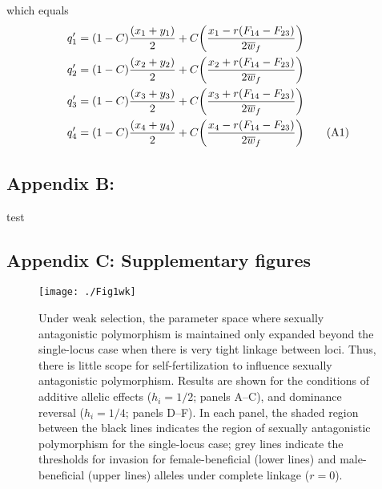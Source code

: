 \documentclass{article}
\newcommand\numberthis{\addtocounter{equation}{1}\tag{\theequation}}
\begin{document}
which equals 
\begin{align*}
	q'_1 &= (1 - C) \frac{(x_1 + y_1)}{2} + C \bigg( \frac{x_1 - r(F_{14} - F_{23})}{2 \overline{w}_f} \bigg) \\
	q'_2 &= (1 - C) \frac{(x_2 + y_2)}{2} + C \bigg( \frac{x_2 + r(F_{14} - F_{23})}{2 \overline{w}_f} \bigg) \\
	q'_3 &= (1 - C) \frac{(x_3 + y_3)}{2} + C \bigg( \frac{x_3 + r(F_{14} - F_{23})}{2 \overline{w}_f} \bigg) \\
	q'_4 &= (1 - C) \frac{(x_4 + y_4)}{2} + C \bigg( \frac{x_4 - r(F_{14} - F_{23})}{2 \overline{w}_f} \bigg) \numberthis
\end{align*}










\subsection*{Appendix B: }
\renewcommand{\thefigure}{B\arabic{figure}}
\setcounter{figure}{0}

test





\subsection*{Appendix C: Supplementary figures}
\renewcommand{\thefigure}{C\arabic{figure}}
\setcounter{figure}{0}

\begin{figure}[!ht]
\texttt{[image: ./Fig1wk]}
\caption{Under weak selection, the parameter space where sexually antagonistic polymorphism is maintained only expanded beyond the single-locus case when there is very tight linkage between loci. Thus, there is little scope for self-fertilization to influence sexually antagonistic polymorphism. Results are shown for the conditions of additive allelic effects ($h_i = 1/2$; panels A--C), and dominance reversal ($h_i = 1/4$; panels D--F). In each panel, the shaded region between the black lines indicates the region of sexually antagonistic polymorphism for the single-locus case; grey lines indicate the thresholds for invasion for female-beneficial (lower lines) and male-beneficial (upper lines) alleles under complete linkage ($r = 0$).}
\label{Fig:Fig1wk.pdf}
\end{figure}
\newpage{}
\end{document}
